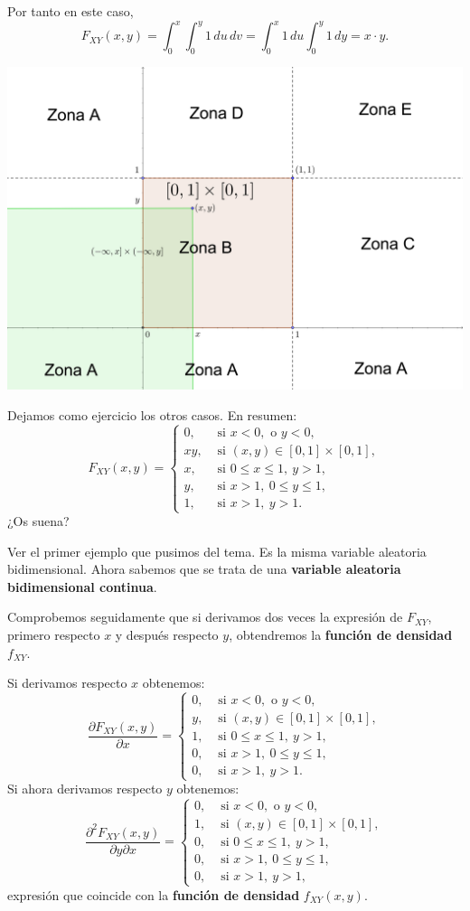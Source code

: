 \documentclass[]{book}
\begin{document}
Por tanto en este caso,
\[
F_{XY}(x,y)=\int_0^x \int_0^y 1\,du\,dv =\int_0^x 1\, du\int_0^y 1\, dy =x\cdot y.
\]

\includegraphics{Images/VaUniformeBidi4.png}

Dejamos como ejercicio los otros casos. En resumen:
\[
F_{XY}(x,y)=\begin{cases}
0, & \mbox{ si }x<0, \mbox{ o }y<0,\\
x y, & \mbox{ si }(x,y)\in [0,1]\times [0,1],\\
x, & \mbox{ si }0\leq x\leq 1,\ y>1,\\
y, & \mbox{ si }x>1,\ 0\leq y\leq 1,\\
1, & \mbox{ si } x>1,\ y>1.
\end{cases}
\]
¿Os suena?

Ver el primer ejemplo que pusimos del tema. Es la misma variable aleatoria bidimensional.
Ahora sabemos que se trata de una \textbf{variable aleatoria bidimensional continua}.

Comprobemos seguidamente que si derivamos dos veces la expresión de \(F_{XY}\), primero respecto \(x\) y después respecto \(y\), obtendremos la \textbf{función de densidad} \(f_{XY}\).

Si derivamos respecto \(x\) obtenemos:
\[
\frac{\partial F_{XY}(x,y)}{\partial x}=\begin{cases}
0, & \mbox{ si }x<0, \mbox{ o }y<0,\\
y, & \mbox{ si }(x,y)\in [0,1]\times [0,1],\\
1, & \mbox{ si }0\leq x\leq 1,\ y>1,\\
0, & \mbox{ si }x>1,\ 0\leq y\leq 1,\\
0, & \mbox{ si } x>1,\ y>1.
\end{cases}
\]
Si ahora derivamos respecto \(y\) obtenemos:
\[
\frac{\partial^2 F_{XY}(x,y)}{\partial y\partial x}=\begin{cases}
0, & \mbox{ si }x<0, \mbox{ o }y<0,\\
1, & \mbox{ si }(x,y)\in [0,1]\times [0,1],\\
0, & \mbox{ si }0\leq x\leq 1,\ y>1,\\
0, & \mbox{ si }x>1,\ 0\leq y\leq 1,\\
0, & \mbox{ si } x>1,\ y>1,
\end{cases}
\]
expresión que coincide con la \textbf{función de densidad} \(f_{XY}(x,y)\).
\end{document}
